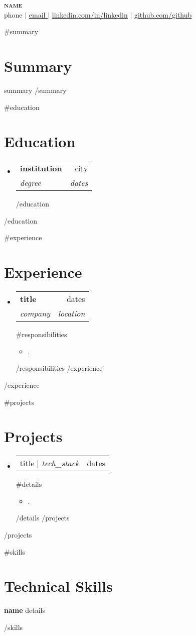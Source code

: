 \documentclass[letterpaper,11pt]{article}
\makeatletter
\newcommand{\resumeItem}[1]{
  \item\small{
    {#1 \vspace{-2pt}}
  }
}
\newcommand{\resumeSubheading}[4]{
  \vspace{-2pt}\item
    \begin{tabular*}{0.97\textwidth}[t]{l@{\extracolsep{\fill}}r}
      \textbf{#1} & #2 \\
      \textit{\small#3} & \textit{\small #4} \\
    \end{tabular*}\vspace{-7pt}
}
\newcommand{\resumeProjectHeading}[2]{
    \item
    \begin{tabular*}{0.97\textwidth}{l@{\extracolsep{\fill}}r}
      \small#1 & #2 \\
    \end{tabular*}\vspace{-7pt}
}
\newcommand{\resumeSubHeadingListStart}{\begin{itemize}[leftmargin=0.15in, label={}]}
\newcommand{\resumeSubHeadingListEnd}{\end{itemize}}
\newcommand{\resumeItemListStart}{\begin{itemize}}
\newcommand{\resumeItemListEnd}{\end{itemize}\vspace{-15pt}}
\makeatother
\begin{document}
\begin{center}
    \textbf{\Huge \scshape {{name}}} \\ \vspace{1pt}
    \small {{phone}} $|$ \href{mailto:{{email}}}{\underline{ {{email}} }} $|$ 
    \href{https://linkedin.com/in/{{linkedin}}}{\underline{linkedin.com/in/{{linkedin}}}} $|$
    \href{https://github.com/{{github}}}{\underline{github.com/{{github}}}}
\end{center}

{{#summary}}
\section{Summary}
{{summary}}
{{/summary}}

{{#education}}
\section{Education}
  \resumeSubHeadingListStart
  {{#education}}
    \resumeSubheading
      { {{institution}} }{ {{city}} }
      { {{degree}} }{ {{dates}} }
  {{/education}}
  \resumeSubHeadingListEnd
{{/education}}

{{#experience}}
\section{Experience}
  \resumeSubHeadingListStart
  {{#experience}}
    \resumeSubheading
      { {{title}} }{ {{dates}} }
      { {{company}} }{ {{location}} }
      {{#responsibilities}}
      \resumeItemListStart
        \resumeItem{ {{.}} }
      \resumeItemListEnd
      {{/responsibilities}}
  {{/experience}}
  \resumeSubHeadingListEnd
{{/experience}}

{{#projects}}
\section{Projects}
  \resumeSubHeadingListStart
  {{#projects}}
    \resumeProjectHeading
      { {{title}} $|$ \emph{ {{tech_stack}} } }{ {{dates}} }
      {{#details}}
      \resumeItemListStart
        \resumeItem{ {{.}} }
      \resumeItemListEnd
      {{/details}}
  {{/projects}}
  \resumeSubHeadingListEnd
{{/projects}}

{{#skills}}
\section{Technical Skills}
 \begin{itemize}[leftmargin=0.15in, label={}]
    \small{\item{
      \textbf{ {{name}} }{ {{details}} } \\
    }}
 \end{itemize}
{{/skills}}

\end{document}
